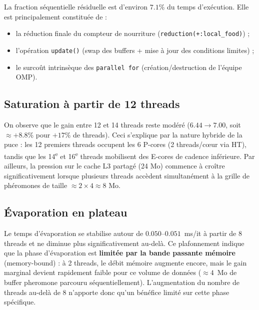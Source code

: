La fraction séquentielle résiduelle est d'environ $7.1\%$ du temps d'exécution.
Elle est principalement constituée de :

\begin{itemize}
    \item la réduction finale du compteur de nourriture (\texttt{reduction(+:local\_food)}) ;
    \item l'opération \texttt{update()} (swap des buffers + mise à jour des conditions limites) ;
    \item le surcoût intrinsèque des \texttt{parallel for} (création/destruction de l'équipe OMP).
\end{itemize}

\subsection{Saturation à partir de 12 threads}

On observe que le gain entre 12 et 14 threads reste modéré ($6.44 \to 7.00$, soit
$\approx +8.8\%$ pour $+17\%$ de threads). Ceci s'explique par la nature hybride de la puce :
les 12 premiers threads occupent les 6 P-cores (2 threads/cœur via HT), tandis que
les 14\textsuperscript{e} et 16\textsuperscript{e} threads mobilisent des E-cores
de cadence inférieure. Par ailleurs, la pression sur le cache L3 partagé (24 Mo)
commence à croître significativement lorsque plusieurs threads accèdent simultanément
à la grille de phéromones de taille $\approx 2 \times 4 \approx 8$ Mo.

\subsection{Évaporation en plateau}

Le temps d'évaporation se stabilise autour de $0.050$--$0.051$~ms/it à partir de
8 threads et ne diminue plus significativement au-delà. Ce plafonnement indique
que la phase d'évaporation est
\textbf{limitée par la bande passante mémoire} (memory-bound) : à 2 threads, le
débit mémoire augmente encore, mais le gain marginal devient rapidement faible pour
ce volume de données ($\approx 4$~Mo de buffer pheromone parcouru séquentiellement).
L'augmentation du nombre de threads au-delà de 8 n'apporte donc qu'un bénéfice limité
sur cette phase spécifique.
